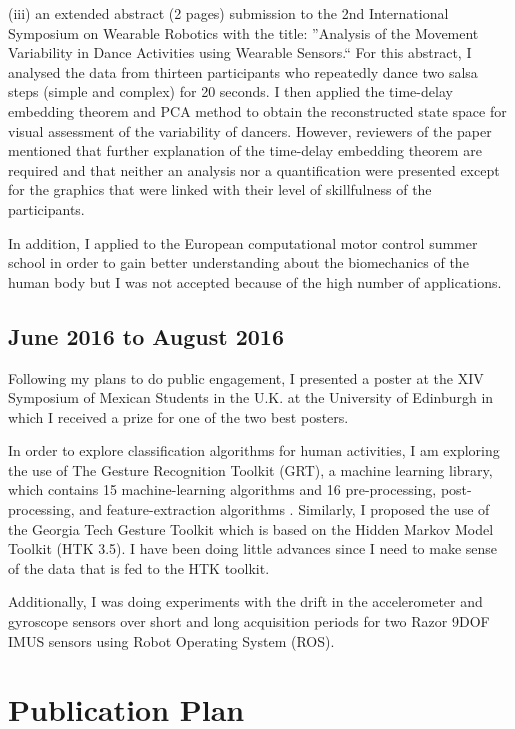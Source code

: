 \documentclass[9pt,journal,onecolumn,compsoc]{IEEEtran}
\begin{document}
(iii) an extended abstract (2 pages) submission to the 2nd International Symposium on Wearable Robotics
with the title: ''Analysis of the Movement Variability in Dance Activities using Wearable Sensors.`` 
For this abstract,
I analysed the data from thirteen participants who repeatedly dance two salsa steps (simple and complex) for 20 seconds. 
I then applied the time-delay embedding theorem and PCA method to obtain the reconstructed state space
for visual assessment of the variability of dancers. 
However, reviewers of the paper mentioned that further explanation of the time-delay embedding theorem are required
and that neither an analysis nor a quantification were presented except for the
graphics that were linked with their level of skillfulness of the participants. 

In addition,
I applied to the European computational motor control summer school
in order to gain better understanding about the biomechanics of the human body 
but I was not accepted because of the high number of applications.

\subsection{June 2016 to August 2016}

Following my plans to do public engagement, I presented a poster at the XIV Symposium of Mexican Students in the U.K. 
at the University of Edinburgh in which I received a prize for one of the two best posters.

In order to explore classification algorithms for human activities,
I am exploring the use of The Gesture Recognition Toolkit (GRT), a machine learning library,
which contains 15 machine-learning algorithms and 16 pre-processing, post-processing, and feature-extraction algorithms 
\cite{Gillian2014}. Similarly, I proposed the use of the Georgia Tech Gesture Toolkit \cite{Westeyn2003}
which is based on the Hidden Markov Model Toolkit (HTK 3.5). I have been doing little advances 
since I need to make sense of the data that is fed to the HTK toolkit.

Additionally, I was doing experiments with the drift in the accelerometer and gyroscope sensors 
over short and long acquisition periods for two Razor 9DOF IMUS sensors using Robot Operating System (ROS).

\section{Publication Plan}
\end{document}
